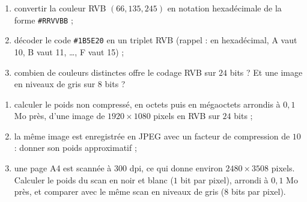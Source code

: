 \begin{exercice}
\begin{enumerate}
\item convertir la couleur RVB $(66, 135, 245)$ en notation hexadécimale de la forme \texttt{\#RRVVBB} ;
\item décoder le code \texttt{\#1B5E20} en un triplet RVB (rappel : en hexadécimal, A vaut 10, B vaut 11, \dots, F vaut 15) ;
\item combien de couleurs distinctes offre le codage RVB sur $24$ bits ? Et une image en niveaux de gris sur $8$ bits ?
\end{enumerate}
\end{exercice}

\begin{exercice}
\begin{enumerate}
\item calculer le poids non compressé, en octets puis en mégaoctets arrondis à $0{,}1$ Mo près, d'une image de $1920 \times 1080$ pixels en RVB sur $24$ bits ;
\item la même image est enregistrée en JPEG avec un facteur de compression de $10$ : donner son poids approximatif ;
\item une page A4 est scannée à $300$ dpi, ce qui donne environ $2480 \times 3508$ pixels. Calculer le poids du scan en noir et blanc ($1$ bit par pixel), arrondi à $0{,}1$ Mo près, et comparer avec le même scan en niveaux de gris ($8$ bits par pixel).
\end{enumerate}
\end{exercice}
